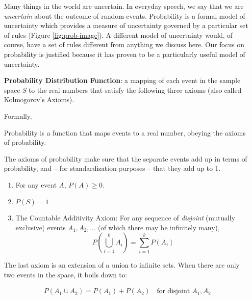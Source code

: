 \documentclass[
]{book}
\begin{document}
Many things in the world are uncertain. In everyday speech, we say that we are \emph{uncertain} about the outcome of random events. Probability is a formal model of uncertainty which provides a measure of uncertainty governed by a particular set of rules (Figure \ref{fig:prob-image}). A different model of uncertainty would, of course, have a set of rules different from anything we discuss here. Our focus on probability is justified because it has proven to be a particularly useful model of uncertainty.

\textbf{Probability Distribution Function}: a mapping of each event in the sample space \(S\) to the real numbers that satisfy the following three axioms (also called Kolmogorov's Axioms).

Formally,

\begin{definition}[Probability]
\protect\hypertarget{def:unnamed-chunk-66}{}\label{def:unnamed-chunk-66}Probability is a function that maps events to a real number, obeying the axioms of probability.
\end{definition}

The axioms of probability make sure that the separate events add up in terms of probability, and -- for standardization purposes -- that they add up to 1.

\begin{definition}
\protect\hypertarget{def:unnamed-chunk-67}{}\label{def:unnamed-chunk-67}

\begin{enumerate}
\def\labelenumi{\arabic{enumi}.}
\tightlist
\item
  For any event \(A\), \(P(A)\ge 0\).
\item
  \(P(S)=1\)
\item
  The Countable Additivity Axiom: For any sequence of \emph{disjoint} (mutually exclusive) events \(A_1,A_2,\ldots\) (of which there may be infinitely many), \[P\left( \bigcup\limits_{i=1}^k
  A_i\right)=\sum\limits_{i=1}^k P(A_i)\]
\end{enumerate}

The last axiom is an extension of a union to infinite sets. When there are only two events in the space, it boils down to:

\begin{align*}
P(A_1 \cup A_2) = P(A_1) + P(A_2) \quad\text{for disjoint } A_1, A_2
\end{align*}

\end{definition}
\end{document}
